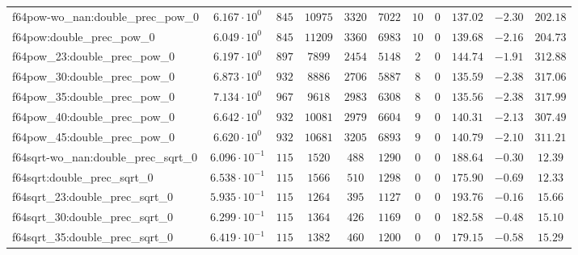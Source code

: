 \begin{tabular}{|l|c|c|c|c|c|c|c|c|c|c|}
f64pow-wo\_nan:double\_prec\_pow\_0            & $ 6.167 \cdot 10^{0}  $ & $ 845    $ & $ 10975  $ & $ 3320  $ & $ 7022   $ & $ 10  $ & $ 0 $ & $ 137.02      $ & $ -2.30   $ & $ 202.18  $ \\
f64pow:double\_prec\_pow\_0                    & $ 6.049 \cdot 10^{0}  $ & $ 845    $ & $ 11209  $ & $ 3360  $ & $ 6983   $ & $ 10  $ & $ 0 $ & $ 139.68      $ & $ -2.16   $ & $ 204.73  $ \\
f64pow\_23:double\_prec\_pow\_0                & $ 6.197 \cdot 10^{0}  $ & $ 897    $ & $ 7899   $ & $ 2454  $ & $ 5148   $ & $ 2   $ & $ 0 $ & $ 144.74      $ & $ -1.91   $ & $ 312.88  $ \\
f64pow\_30:double\_prec\_pow\_0                & $ 6.873 \cdot 10^{0}  $ & $ 932    $ & $ 8886   $ & $ 2706  $ & $ 5887   $ & $ 8   $ & $ 0 $ & $ 135.59      $ & $ -2.38   $ & $ 317.06  $ \\
f64pow\_35:double\_prec\_pow\_0                & $ 7.134 \cdot 10^{0}  $ & $ 967    $ & $ 9618   $ & $ 2983  $ & $ 6308   $ & $ 8   $ & $ 0 $ & $ 135.56      $ & $ -2.38   $ & $ 317.99  $ \\
f64pow\_40:double\_prec\_pow\_0                & $ 6.642 \cdot 10^{0}  $ & $ 932    $ & $ 10081  $ & $ 2979  $ & $ 6604   $ & $ 9   $ & $ 0 $ & $ 140.31      $ & $ -2.13   $ & $ 307.49  $ \\
f64pow\_45:double\_prec\_pow\_0                & $ 6.620 \cdot 10^{0}  $ & $ 932    $ & $ 10681  $ & $ 3205  $ & $ 6893   $ & $ 9   $ & $ 0 $ & $ 140.79      $ & $ -2.10   $ & $ 311.21  $ \\
f64sqrt-wo\_nan:double\_prec\_sqrt\_0          & $ 6.096 \cdot 10^{-1} $ & $ 115    $ & $ 1520   $ & $ 488   $ & $ 1290   $ & $ 0   $ & $ 0 $ & $ 188.64      $ & $ -0.30   $ & $ 12.39   $ \\
f64sqrt:double\_prec\_sqrt\_0                  & $ 6.538 \cdot 10^{-1} $ & $ 115    $ & $ 1566   $ & $ 510   $ & $ 1298   $ & $ 0   $ & $ 0 $ & $ 175.90      $ & $ -0.69   $ & $ 12.33   $ \\
f64sqrt\_23:double\_prec\_sqrt\_0              & $ 5.935 \cdot 10^{-1} $ & $ 115    $ & $ 1264   $ & $ 395   $ & $ 1127   $ & $ 0   $ & $ 0 $ & $ 193.76      $ & $ -0.16   $ & $ 15.66   $ \\
f64sqrt\_30:double\_prec\_sqrt\_0              & $ 6.299 \cdot 10^{-1} $ & $ 115    $ & $ 1364   $ & $ 426   $ & $ 1169   $ & $ 0   $ & $ 0 $ & $ 182.58      $ & $ -0.48   $ & $ 15.10   $ \\
f64sqrt\_35:double\_prec\_sqrt\_0              & $ 6.419 \cdot 10^{-1} $ & $ 115    $ & $ 1382   $ & $ 460   $ & $ 1200   $ & $ 0   $ & $ 0 $ & $ 179.15      $ & $ -0.58   $ & $ 15.29   $ \\

\end{tabular}
